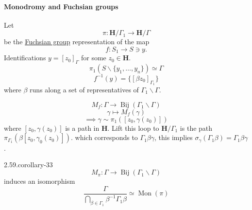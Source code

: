 \documentclass[10pt,]{book}
\numberwithin{equation}{section}
\newcommand{\inv}{^{-1}}
\newcommand{\lb}{[}
\newcommand{\rb}{]}
\newcommand{\HH}{\mathbf{H}}
\begin{document}
\paragraph[{Monodromy and Fuchsian groups}]{Monodromy and Fuchsian groups}\hypertarget{paragraphs-13}{}
\hypertarget{p-579}{}%
Let%
\begin{equation*}
\pi \colon \HH/\Gamma_1 \to \HH/ \Gamma
\end{equation*}
be the \hyperref[def-fuchsian-group]{Fuchsian group} representation of the map%
\begin{equation*}
f\colon S_1 \to S\ni y\text{.}
\end{equation*}
Identifications \(y = \lb z_0 \rb_\Gamma\) for some \(z_0 \in \HH\).%
\begin{equation*}
\pi_1 (S\smallsetminus \{y_1,\ldots, y_n\}) \simeq \Gamma
\end{equation*}
%
\begin{equation*}
f\inv(y ) = \{ [\beta z_0]_{\Gamma_1}\}
\end{equation*}
where \(\beta\) runs along a set of representatives of \(\Gamma_1\backslash \Gamma\).%
\par
\hypertarget{p-580}{}%
%
\begin{equation*}
M_f \colon \Gamma \to \operatorname{Bij} (\Gamma_1\backslash \Gamma)
\end{equation*}
%
\begin{equation*}
\gamma \mapsto M_f(\gamma)
\end{equation*}
%
\begin{equation*}
\implies \gamma \sim \pi_1([z_0,\gamma(z_0)])
\end{equation*}
where \(\lb z_0, \gamma(z_0) \rb\) is a path in \(\HH\). Lift this loop to \(\HH/\Gamma_1\) is the path \(\pi_{\Gamma_1}(\beta \lb z_0, \gamma_0(z_0)\rb)\). which corresponds to \(\Gamma_1 \beta \gamma\), this implies \(\sigma_\gamma(\Gamma_1\beta)  = \Gamma_1 \beta\gamma\).%
\begin{corollary}{2.59.}{}{corollary-33}%
\hypertarget{p-581}{}%
%
\begin{equation*}
M_\pi \colon \Gamma \to \operatorname{Bij} (\Gamma_1 \backslash \Gamma)
\end{equation*}
induces an isomorphism%
\begin{equation*}
\frac{\Gamma}{\bigcap_{\beta\in \Gamma_1} \beta\inv \Gamma_1 \beta} \simeq \operatorname{Mon}(\pi)
\end{equation*}
%
\end{corollary}
\hypertarget{p-582}{}%
\end{document}
